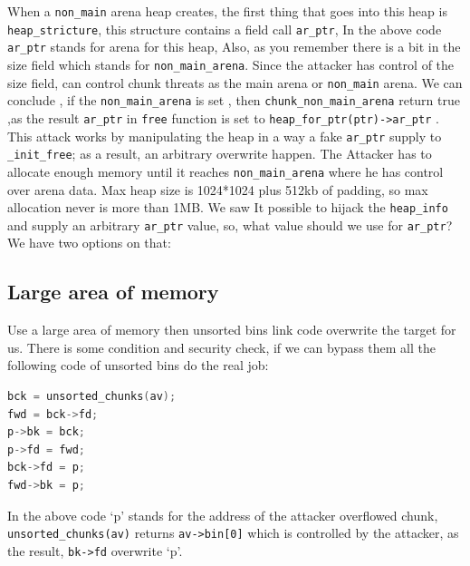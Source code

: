 \documentclass{masterthesis}
\newcommand*\ub{unsorted bins}
\begin{document}
When a \lstinline{non_main} arena heap creates, the first thing that goes into this heap is \lstinline{heap_stricture}, this structure contains a field call \lstinline{ar_ptr}, In the above code \lstinline{ar_ptr} stands for arena for this heap, Also, as you remember there is a bit in the size field which stands for \lstinline{non_main_arena}. Since the attacker has control of the size field, can control chunk threats as the main arena or \lstinline{non_main} arena. We can conclude , if the \lstinline{non_main_arena} is set , then \lstinline{chunk_non_main_arena} return true ,as the result \lstinline{ar_ptr} in \lstinline{free} function is set to \lstinline{heap_for_ptr(ptr)->ar_ptr} .
This attack works by manipulating the heap in a way a fake \lstinline{ar_ptr} supply to \lstinline{_init_free}; as a result, an arbitrary overwrite happen. The Attacker has to allocate enough memory until it reaches \lstinline{non_main_arena} where he has control over arena data. Max heap size is 1024*1024 plus 512kb of padding, so max allocation never is more than 1MB.
We saw It possible to hijack the \lstinline{heap_info} and supply an arbitrary \lstinline{ar_ptr} value, so, what value should we use for \lstinline{ar_ptr}? We have two options on that:

\subsection{Large area of memory}
Use a large area of memory then \ub{} link code overwrite the target for us. There is some condition and security check, if we can bypass them all the following code of \ub{} do the real job:
\begin{lstlisting}[language=c,frame=tlrb]
bck = unsorted_chunks(av);
fwd = bck->fd;
p->bk = bck;
p->fd = fwd;
bck->fd = p;
fwd->bk = p;
\end{lstlisting}

In the above code ‘p’ stands for the address of the attacker overflowed chunk, \lstinline{unsorted_chunks(av)} returns \lstinline{av->bin[0]} which is controlled by the attacker, as the result, \lstinline{bk->fd} overwrite ‘p’.
\end{document}
